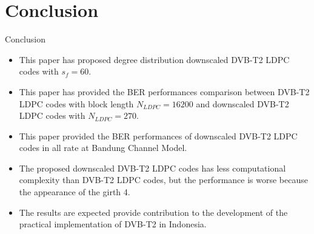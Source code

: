 \documentclass[11pt, aspectratio=169]{beamer}
\begin{document}





\section{Conclusion}
\begin{frame}{Conclusion}
\begin{itemize}
\justifying
\item This paper has proposed degree distribution downscaled DVB-T2 LDPC codes with $s_f=60$.
\item This paper has provided the BER performances comparison between DVB-T2 LDPC codes with block length $N_{LDPC}=16200$ and downscaled DVB-T2 LDPC codes with $N_{LDPC}=270$. 
\item This paper provided the BER performances of downscaled DVB-T2 LDPC codes in all rate at Bandung Channel Model.
\item The proposed downscaled DVB-T2 LDPC codes has less computational complexity than DVB-T2 LDPC codes, but the performance is worse because the appearance of the girth 4.
\item The results are expected provide contribution to the development of the practical implementation of DVB-T2 in Indonesia. 
\end{itemize}
\end{frame}
\end{document}
